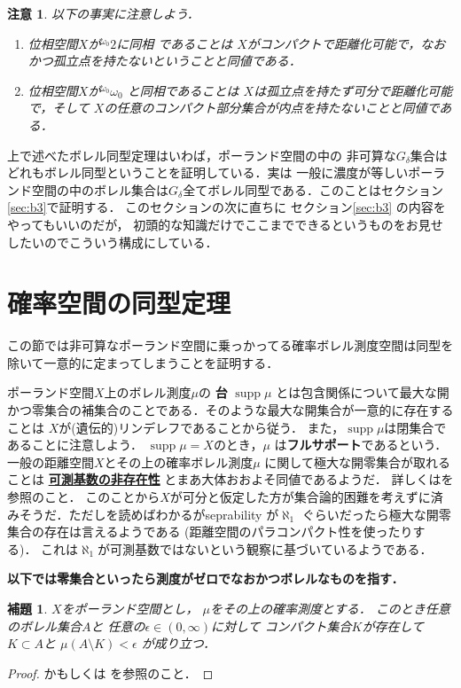 \documentclass[leqno, 12pt]{jsarticle}
\newtheorem{lem}[thm]{補題}
\newtheorem*{rmk}{注意}
\DeclareMathOperator{\supp}{supp}
\newcommand{\myomega}{\omega_{0}}
\newcommand{\mycantor}{{}^{\myomega}2}
\newcommand{\mybaire}{{}^{\myomega}\myomega}
\begin{document}
\begin{rmk}
以下の事実に注意しよう．
\begin{enumerate}
\item 
位相空間$X$が$\mycantor$に同相
であることは
$X$がコンパクトで距離化可能で，なおかつ孤立点を持たないということと同値である．
\item 
位相空間$X$が$\mybaire$
と同相であることは
$X$は孤立点を持たず可分で距離化可能で，そして
$X$の任意のコンパクト部分集合が内点を持たないことと同値である．

\end{enumerate}
\end{rmk}

上で述べたボレル同型定理はいわば，ポーランド空間の中の
非可算な$G_{\delta}$集合はどれもボレル同型ということを証明している．実は
一般に濃度が等しいポーランド空間の中のボレル集合は$G_{\delta}$全てボレル同型である．このことはセクション\ref{sec:b3}で証明する．
このセクションの次に直ちに
セクション\ref{sec:b3}
の内容をやってもいいのだが，
初頭的な知識だけでここまでできるというものをお見せしたいのでこういう構成にしている．


\section{確率空間の同型定理}\label{sec:pp}
この節では非可算なポーランド空間に乗っかってる確率ボレル測度空間は同型を除いて一意的に定まってしまうことを証明する．

ポーランド空間$X$上のボレル測度$\mu$の
\textbf{台}
$\supp \mu$
とは包含関係について最大な開かつ零集合の補集合のことである．そのような最大な開集合が一意的に存在することは
$X$が(遺伝的)リンデレフであることから従う．
また，$\supp\mu$は閉集合であることに注意しよう．
$\supp \mu=X$のとき，$\mu$
は\textbf{フルサポート}であるという．
一般の距離空間$X$とその上の確率ボレル測度$\mu$
に関して極大な開零集合が取れることは
\underline{\textbf{可測基数の非存在性}}
とまあ大体おおよそ同値であるようだ．
詳しくは\cite{colloq}を参照のこと．
このことから$X$が可分と仮定した方が集合論的困難を考えずに済みそうだ．ただし\cite{colloq}を読めばわかるがseprability が$\aleph_{1}$
ぐらいだったら極大な開零集合の存在は言えるようである
(距離空間のパラコンパクト性を使ったりする)．
これは$\aleph_{1}$が可測基数ではないという観察に基づいているようである．

\textbf{以下では零集合といったら測度がゼロでなおかつボレルなものを指す．}


\begin{lem}\label{lem:cptreg}
$X$をポーランド空間とし，
$\mu$をその上の確率測度とする．
このとき任意のボレル集合$A$と
任意の$\epsilon\in (0, \infty)$に対して
コンパクト集合$K$が存在して
$K\subset A$と
$\mu(A\setminus K)<\epsilon$
が成り立つ．

\end{lem}
\begin{proof}
\cite{0}かもしくは
\cite[命題 11]{hatena2}を参照のこと．
\end{proof}
\end{document}
